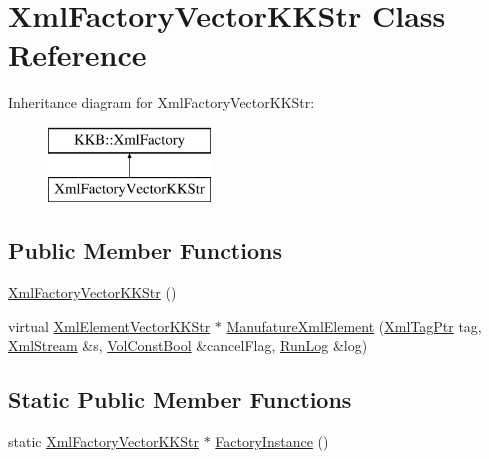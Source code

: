 \hypertarget{class_xml_factory_vector_k_k_str}{}\section{Xml\+Factory\+Vector\+K\+K\+Str Class Reference}
\label{class_xml_factory_vector_k_k_str}
Inheritance diagram for Xml\+Factory\+Vector\+K\+K\+Str\+:\begin{figure}[H]
\begin{center}
\leavevmode
\includegraphics[height=2.000000cm]{class_xml_factory_vector_k_k_str}
\end{center}
\end{figure}
\subsection*{Public Member Functions}
\begin{DoxyCompactItemize}
\item 
\hyperlink{class_xml_factory_vector_k_k_str_a56f8dd76a9ce03c0f5bff6ee9a2b7e83}{Xml\+Factory\+Vector\+K\+K\+Str} ()
\item 
virtual \hyperlink{namespace_k_k_b_ae7f117b12a72568bc7ab4a0322f2c4a4}{Xml\+Element\+Vector\+K\+K\+Str} $\ast$ \hyperlink{class_xml_factory_vector_k_k_str_a4135dd3c2d040b4bc8b6e60119762c92}{Manufature\+Xml\+Element} (\hyperlink{namespace_k_k_b_a9253a3ea8a5da18ca82be4ca2b390ef0}{Xml\+Tag\+Ptr} tag, \hyperlink{class_k_k_b_1_1_xml_stream}{Xml\+Stream} \&s, \hyperlink{namespace_k_k_b_a7d390f568e2831fb76b86b56c87bf92f}{Vol\+Const\+Bool} \&cancel\+Flag, \hyperlink{class_k_k_b_1_1_run_log}{Run\+Log} \&log)
\end{DoxyCompactItemize}
\subsection*{Static Public Member Functions}
\begin{DoxyCompactItemize}
\item 
static \hyperlink{class_xml_factory_vector_k_k_str}{Xml\+Factory\+Vector\+K\+K\+Str} $\ast$ \hyperlink{class_xml_factory_vector_k_k_str_a553f648cf0079e9a4c5a33d0e8b1ce23}{Factory\+Instance} ()
\end{DoxyCompactItemize}
